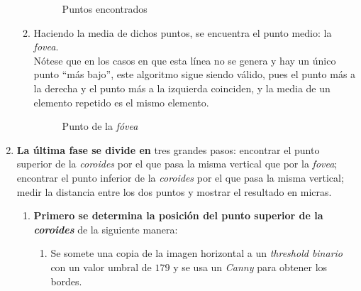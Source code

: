 \begin{enumerate}
\begin{enumerate}[label*=\arabic*.]
    \begin{figure}[H]
      \caption{Puntos encontrados}
      \centering \setlength\fboxsep{0pt} \setlength\fboxrule{0.5pt}
    \end{figure}

  \item Haciendo la media de dichos
    puntos, se encuentra el punto medio: la \emph{\gls{fovea}}. \\
    Nótese que en los casos en que esta línea no se genera y hay un
    único punto ``más bajo'', este algoritmo sigue siendo válido, pues
    el punto más a la derecha y el punto más a la izquierda coinciden,
    y la media de un elemento repetido es el mismo elemento.

    \begin{figure}[H]
      \caption{Punto de la \emph{fóvea}}
      \centering \setlength\fboxsep{0pt} \setlength\fboxrule{0.5pt}
    \end{figure}

  \end{enumerate}
\item \textbf{La última fase se divide en} tres grandes pasos:
  encontrar el punto superior de la \emph{\gls{coroides}} por el que
  pasa la misma vertical que por la \emph{\gls{fovea}}; encontrar el
  punto inferior de la \emph{\gls{coroides}} por el que pasa la misma
  vertical; medir la distancia entre los dos puntos y mostrar el
  resultado en micras.
  \begin{enumerate}[label*=\arabic*.]
  \item \textbf{Primero se determina la posición del punto superior de
      la \emph{\gls{coroides}}} de la siguiente manera:
    \begin{enumerate}[label*=\arabic*.]
    \item Se somete una copia de la imagen horizontal a un
      \emph{threshold binario} con un valor umbral de $179$ y se usa
      un \emph{Canny} para obtener los bordes.


\end{enumerate}
\end{enumerate}
\end{enumerate}
